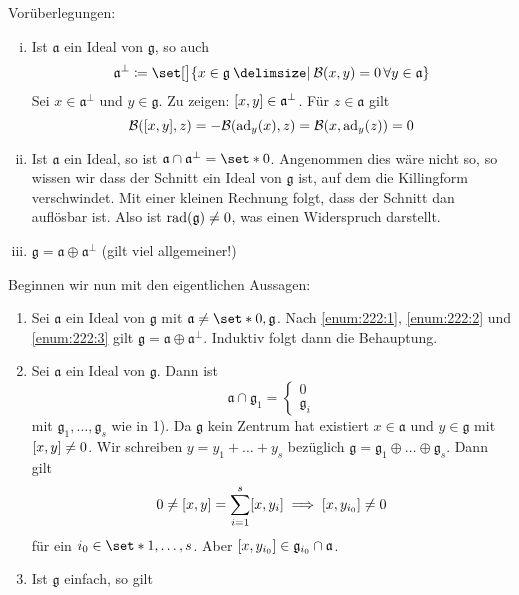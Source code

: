 \begin{beweis}
	Vorüberlegungen:
	\begin{enumerate}[i)]
		\item \label{enum:222:1} Ist $\mathfrak{a}$ ein Ideal von $\mathfrak{g}$, so auch 
		\[
			\mathfrak{a}^\perp \coloneqq \set[\big]{x \in \mathfrak{g} \given \mathcal{B}(x,y) =0 \,\forall y \in \mathfrak{a}}
		\]
		Sei $x \in \mathfrak{a}^\perp$ und $y \in \mathfrak{g}$. Zu zeigen: $\benbrace*{x,y} \in \mathfrak{a}^\perp$.
		Für $z \in \mathfrak{a}$ gilt
		\[
			\mathcal{B} \enbrace*{\benbrace*{x,y},z} = - \mathcal{B} \enbrace*{\ad_y(x), z} = \mathcal{B} \enbrace*{x, \ad_y(z)} =0
		\]
		\item \label{enum:222:2} Ist $\mathfrak{a}$ ein Ideal, so ist $\mathfrak{a} \cap \mathfrak{a}^\bot = \set*{0}$.
		Angenommen dies wäre nicht so, so wissen wir dass der Schnitt ein Ideal von $\mathfrak{g}$ ist, auf dem die Killingform verschwindet.
		Mit einer kleinen Rechnung folgt, dass der Schnitt dan auflösbar ist.
		Also ist $\rad(\mathfrak{g}) \neq 0$, was einen Widerspruch darstellt.
		\item \label{enum:222:3} $\mathfrak{g} = \mathfrak{a} \oplus \mathfrak{a}^\perp$ (gilt viel allgemeiner!)
	\end{enumerate}
	Beginnen wir nun mit den eigentlichen Aussagen:
	\begin{enumerate}[1)]
		\item Sei $\mathfrak{a}$ ein Ideal von $\mathfrak{g}$ mit $\mathfrak{a} \neq \set*{0}, \mathfrak{g}$.
		Nach \ref{enum:222:1}, \ref{enum:222:2} und \ref{enum:222:3} gilt $\mathfrak{g} = \mathfrak{a} \oplus \mathfrak{a}^\perp$.
		Induktiv folgt dann die Behauptung.
		\item Sei $\mathfrak{a}$ ein Ideal von $\mathfrak{g}$.
		Dann ist 
		\[
			\mathfrak{a} \cap \mathfrak{g}_1 = \begin{cases}
				0 \\
				\mathfrak{g}_i 
			\end{cases}
		\]
		mit $\mathfrak{g}_1, \ldots ,\mathfrak{g}_s$ wie in 1).
		Da $\mathfrak{g}$ kein Zentrum hat existiert $x \in \mathfrak{a}$ und $y \in \mathfrak{g}$ mit $\benbrace*{x,y} \neq 0$.
		Wir schreiben $y = y_1 + \ldots + y_s$ bezüglich $\mathfrak{g} = \mathfrak{g}_1 \oplus  \ldots \oplus \mathfrak{g}_s$.
		Dann gilt 
		\[
			0 \neq\benbrace*{x,y} = \sum_{i=1}^{s} \benbrace*{x,y_i} \implies \benbrace*{x,y_{i_0}} \neq 0
		\]
		für ein $i_0 \in \set*{1,\ldots ,s}$. Aber $\benbrace*{x,y_{i_0}} \in \mathfrak{g}_{i_0} \cap \mathfrak{a}$.
		\item Ist $\mathfrak{g}$ einfach, so gilt 

\end{enumerate}
\end{beweis}
